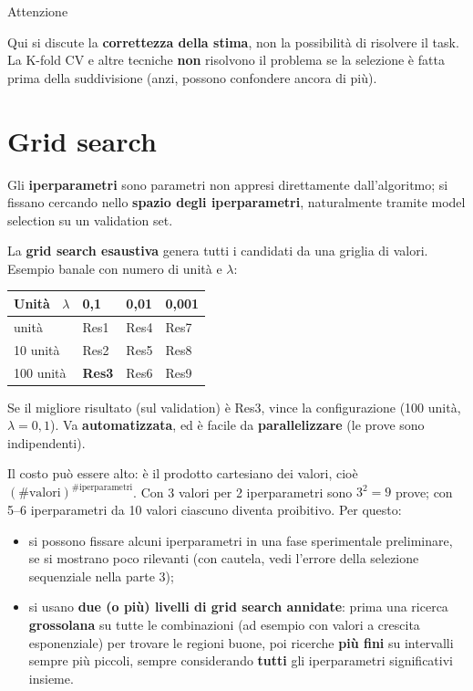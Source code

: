\begin{boxwarning}{Attenzione}

Qui si discute la \textbf{correttezza della stima}, non la possibilità
di risolvere il task. La K-fold CV e altre tecniche \textbf{non}
risolvono il problema se la selezione è fatta prima della suddivisione
(anzi, possono confondere ancora di più).

\end{boxwarning}

\section{Grid search}\label{grid-search}

Gli \textbf{iperparametri} sono parametri non appresi direttamente
dall'algoritmo; si fissano cercando nello \textbf{spazio degli
iperparametri}, naturalmente tramite model selection su un validation
set.

La \textbf{grid search esaustiva} genera tutti i candidati da una
griglia di valori. Esempio banale con numero di unità e \(\lambda\):

{\def\LTcaptype{none} %
\begin{longtable}[]{@{}llll@{}}
\toprule\noalign{}
Unità ~\(\lambda\) & 0,1 & 0,01 & 0,001 \\
\midrule\noalign{}
\endhead
\bottomrule\noalign{}
\endlastfoot
1 unità & Res1 & Res4 & Res7 \\
10 unità & Res2 & Res5 & Res8 \\
100 unità & \textbf{Res3} & Res6 & Res9 \\
\end{longtable}
}

Se il migliore risultato (sul validation) è Res3, vince la
configurazione (100 unità, \(\lambda = 0{,}1\)). Va
\textbf{automatizzata}, ed è facile da \textbf{parallelizzare} (le prove
sono indipendenti).

Il costo può essere alto: è il prodotto cartesiano dei valori, cioè
\((\#\text{valori})^{\#\text{iperparametri}}\). Con 3 valori per 2
iperparametri sono \(3^2 = 9\) prove; con 5--6 iperparametri da 10
valori ciascuno diventa proibitivo. Per questo:

\begin{itemize}
\tightlist
\item
  si possono fissare alcuni iperparametri in una fase sperimentale
  preliminare, se si mostrano poco rilevanti (con cautela, vedi l'errore
  della selezione sequenziale nella parte 3);
\item
  si usano \textbf{due (o più) livelli di grid search annidate}: prima
  una ricerca \textbf{grossolana} su tutte le combinazioni (ad esempio
  con valori a crescita esponenziale) per trovare le regioni buone, poi
  ricerche \textbf{più fini} su intervalli sempre più piccoli, sempre
  considerando \textbf{tutti} gli iperparametri significativi insieme.
\end{itemize}


